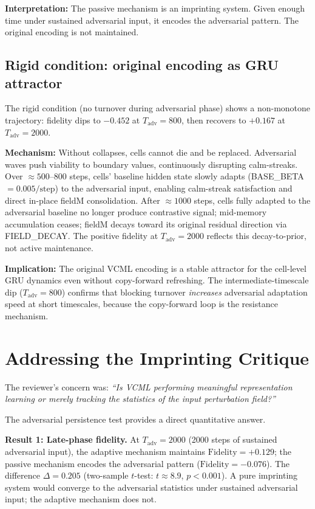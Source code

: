 \documentclass[11pt]{article}
\begin{document}
\textbf{Interpretation:} The passive mechanism is an imprinting system.
Given enough time under sustained adversarial input, it encodes the adversarial pattern.
The original encoding is not maintained.

\subsection{Rigid condition: original encoding as GRU attractor}

The rigid condition (no turnover during adversarial phase) shows a non-monotone
trajectory: fidelity dips to $-0.452$ at $T_\mathrm{adv}=800$, then recovers to
$+0.167$ at $T_\mathrm{adv}=2000$.

\textbf{Mechanism:} Without collapses, cells cannot die and be replaced.
Adversarial waves push viability to boundary values, continuously disrupting calm-streaks.
Over $\approx 500$--$800$ steps, cells' baseline hidden state slowly adapts
(BASE\_BETA $= 0.005/\mathrm{step}$) to the adversarial input, enabling calm-streak
satisfaction and direct in-place fieldM consolidation.
After $\approx 1000$ steps, cells fully adapted to the adversarial baseline no longer
produce contrastive signal; mid-memory accumulation ceases; fieldM decays toward its
original residual direction via FIELD\_DECAY.
The positive fidelity at $T_\mathrm{adv}=2000$ reflects this decay-to-prior, not
active maintenance.

\textbf{Implication:} The original VCML encoding is a stable attractor for the
cell-level GRU dynamics even without copy-forward refreshing.
The intermediate-timescale dip ($T_\mathrm{adv}=800$) confirms that blocking turnover
\emph{increases} adversarial adaptation speed at short timescales, because
the copy-forward loop is the resistance mechanism.

\section{Addressing the Imprinting Critique}

The reviewer's concern was:
\emph{``Is VCML performing meaningful representation learning or merely tracking the
statistics of the input perturbation field?''}

The adversarial persistence test provides a direct quantitative answer.

\textbf{Result 1: Late-phase fidelity.}
At $T_\mathrm{adv} = 2000$ (2000 steps of sustained adversarial input), the adaptive
mechanism maintains $\mathrm{Fidelity} = +0.129$; the passive mechanism encodes the
adversarial pattern ($\mathrm{Fidelity} = -0.076$).
The difference $\Delta = 0.205$ (two-sample $t$-test: $t \approx 8.9$, $p < 0.001$).
A pure imprinting system would converge to the adversarial statistics under sustained
adversarial input; the adaptive mechanism does not.
\end{document}

